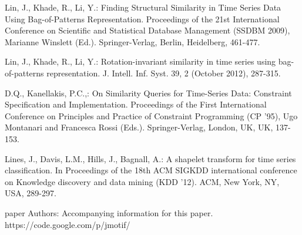 \documentclass{llncs}
\begin{document}
\begin{thebibliography}{5}
Lin, J., Khade, R., Li, Y.:
Finding Structural Similarity in Time Series Data Using Bag-of-Patterns Representation. 
Proceedings of the 21st International Conference on Scientific and Statistical Database Management (SSDBM 2009),
Marianne Winslett (Ed.). Springer-Verlag, Berlin, Heidelberg, 461-477.

Lin, J., Khade, R., Li, Y.:
Rotation-invariant similarity in time series using bag-of-patterns representation. 
J. Intell. Inf. Syst. 39, 2 (October 2012), 287-315.

D.Q., Kanellakis, P.C.,:
On Similarity Queries for Time-Series Data: Constraint Specification and Implementation. 
Proceedings of the First International Conference on Principles and Practice of Constraint Programming (CP '95), 
Ugo Montanari and Francesca Rossi (Eds.). Springer-Verlag, London, UK, UK, 137-153.

Lines, J., Davis, L.M., Hills, J., Bagnall, A.:
A shapelet transform for time series classification. 
In Proceedings of the 18th ACM SIGKDD international conference on Knowledge discovery and data mining (KDD '12). 
ACM, New York, NY, USA, 289-297.


paper Authors: 
Accompanying information for this paper. 
https://code.google.com/p/jmotif/

\end{thebibliography}

%
\end{document}
